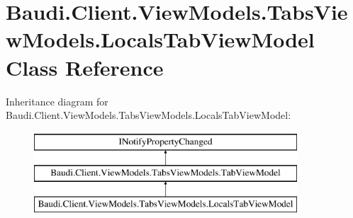 \hypertarget{class_baudi_1_1_client_1_1_view_models_1_1_tabs_view_models_1_1_locals_tab_view_model}{}\section{Baudi.\+Client.\+View\+Models.\+Tabs\+View\+Models.\+Locals\+Tab\+View\+Model Class Reference}
\label{class_baudi_1_1_client_1_1_view_models_1_1_tabs_view_models_1_1_locals_tab_view_model}
Inheritance diagram for Baudi.\+Client.\+View\+Models.\+Tabs\+View\+Models.\+Locals\+Tab\+View\+Model\+:\begin{figure}[H]
\begin{center}
\leavevmode
\includegraphics[height=3.000000cm]{class_baudi_1_1_client_1_1_view_models_1_1_tabs_view_models_1_1_locals_tab_view_model}
\end{center}
\end{figure}
